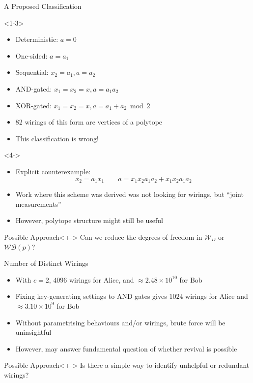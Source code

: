 \documentclass[xcolor=dvipsnames]{beamer}
\newcommand{\?}{\mathrel{?}} %
\newcommand{\sW}{\mathcal{W}}
\newcommand{\sWB}{\mathcal{WB}}
\begin{document}
\begin{frame}{A Proposed Classification}
  \begin{onlyenv}<1-3>
    \begin{itemize}
      \item Deterministic: \(a = 0\)
      \item One-sided: \(a = a_1\)
      \item Sequential: \(x_2 = a_1, a = a_2\)
      \item AND-gated: \(x_1 = x_2 = x, a = a_1a_2\)
      \item<+-> XOR-gated: \(x_1 = x_2 = x, a = a_1 + a_2 \bmod 2\)
      \item<+-> 82 wirings of this form are vertices of a polytope
      \item<+-> This classification is \alert{wrong}!
    \end{itemize}
  \end{onlyenv}
  \begin{onlyenv}<4->
    \begin{itemize}[<+->]
      \item Explicit counterexample:
        \[ x_2 = \bar{a}_1x_1 \qquad a = x_1x_2\bar{a}_1\bar{a}_2 + \bar{x}_1\bar{x}_2a_1a_2 \]
      \item Work where this scheme was derived was not looking for wirings, but ``joint measurements''
      \item However, polytope structure might still be useful
    \end{itemize}
  \end{onlyenv}
  \begin{block}{Possible Approach}<+->
    Can we reduce the degrees of freedom in \(\sW_D\) or \(\sWB(p)\)?
  \end{block}
\end{frame}

\begin{frame}{Number of Distinct Wirings}
  \begin{itemize}[<+->]
    \item With \(c=2\), \(4096\) wirings for Alice, and \(\approx 2.48 \times 10^{10}\) for Bob
    \item Fixing key-generating settings to AND gates gives \(1024\) wirings for Alice and \(\approx 3.10 \times 10^{9}\) for Bob
    \item Without parametrising behaviours and/or wirings, brute force will be uninsightful
    \item However, may answer fundamental question of whether revival is possible
  \end{itemize}
  \begin{block}{Possible Approach}<+->
    Is there a simple way to identify unhelpful or redundant wirings?
  \end{block}
\end{frame}
\end{document}
